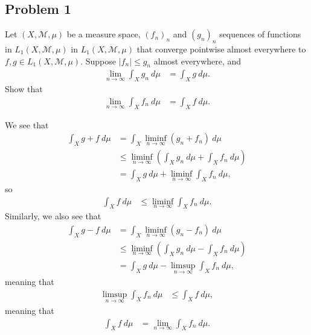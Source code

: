 \documentclass[10pt]{mypackage}
\begin{document}
\subsection{Problem 1}%
\begin{problem}
  Let $\left( X,\mathcal{M},\mu \right)$ be a measure space, $\left( f_n \right)_n$ and $\left( g_n \right)_n$ sequences of functions in $L_1\left( X,\mathcal{M},\mu \right)$ in $L_1\left( X,\mathcal{M},\mu \right)$ that converge pointwise almost everywhere to $f,g\in L_1\left( X,\mathcal{M},\mu \right)$. Suppose $\left\vert f_n \right\vert \leq g_n$ almost everywhere, and
  \begin{align*}
    \lim_{n\rightarrow\infty} \int_{X}^{} g_n\:d\mu &= \int_{X}^{} g\:d\mu.
  \end{align*}
  Show that
  \begin{align*}
    \lim_{n\rightarrow\infty} \int_{X}^{} f_n\:d\mu &= \int_{X}^{} f\:d\mu.
  \end{align*}
\end{problem}
We see that
\begin{align*}
  \int_{X}^{} g + f\:d\mu &= \int_{X}^{} \liminf_{n\rightarrow\infty}\left( g_n + f_n \right)\:d\mu\\
                          &\leq \liminf_{n\rightarrow\infty}\left( \int_{X}^{} g_n\:d\mu + \int_{X}^{} f_n\:d\mu \right)\\
                          &= \int_{X}^{} g\:d\mu + \liminf_{n\rightarrow\infty} \int_{X}^{} f_n\:d\mu,
\end{align*}
so
\begin{align*}
  \int_{X}^{} f\:d\mu &\leq \liminf_{n\rightarrow\infty} \int_{X}^{} f_n\:d\mu.
\end{align*}
Similarly, we also see that
\begin{align*}
  \int_{X}^{} g-f\:d\mu &= \int_{X}^{} \liminf_{n\rightarrow\infty}\left( g_n-f_n \right)\:d\mu\\
                        &\leq \liminf_{n\rightarrow\infty} \left( \int_{X}^{} g_n\:d\mu - \int_{X}^{} f_n\:d\mu \right)\\
                        &= \int_{X}^{} g\:d\mu - \limsup_{n\rightarrow\infty} \int_{X}^{} f_n\:d\mu,
\end{align*}
meaning that
\begin{align*}
  \limsup_{n\rightarrow\infty} \int_{X}^{} f_n\:d\mu &\leq \int_{X}^{} f\:d\mu,
\end{align*}
meaning that
\begin{align*}
  \int_{X}^{} f\:d\mu &= \lim_{n\rightarrow\infty} \int_{X}^{} f_n\:d\mu.
\end{align*}
\end{document}
